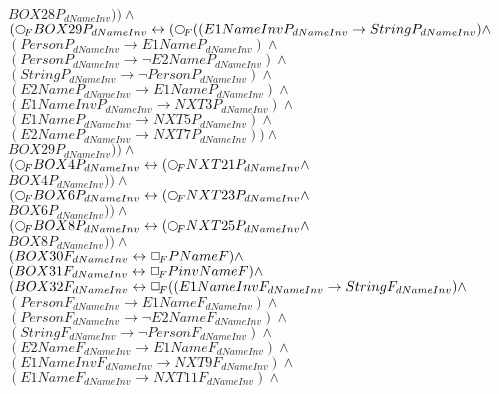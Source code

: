 \documentclass[a4paper,10pt]{article}
\begin{document}
 $ BOX28P_{dNameInv})) \land $ \\ 
 $ ( \Rnext BOX29P_{dNameInv} \leftrightarrow ( \Rnext ((E1NameInvP_{dNameInv} \rightarrow StringP_{dNameInv}) \land $ \\ 
 $ (PersonP_{dNameInv} \rightarrow E1NameP_{dNameInv}) \land $ \\ 
 $ (PersonP_{dNameInv} \rightarrow  \lnot E2NameP_{dNameInv}) \land $ \\ 
 $ (StringP_{dNameInv} \rightarrow  \lnot PersonP_{dNameInv}) \land $ \\ 
 $ (E2NameP_{dNameInv} \rightarrow E1NameP_{dNameInv}) \land $ \\ 
 $ (E1NameInvP_{dNameInv} \rightarrow NXT3P_{dNameInv}) \land $ \\ 
 $ (E1NameP_{dNameInv} \rightarrow NXT5P_{dNameInv}) \land $ \\ 
 $ (E2NameP_{dNameInv} \rightarrow NXT7P_{dNameInv})) \land $ \\ 
 $ BOX29P_{dNameInv})) \land $ \\ 
 $ ( \Rnext BOX4P_{dNameInv} \leftrightarrow ( \Rnext NXT21P_{dNameInv} \land $ \\ 
 $ BOX4P_{dNameInv})) \land $ \\ 
 $ ( \Rnext BOX6P_{dNameInv} \leftrightarrow ( \Rnext NXT23P_{dNameInv} \land $ \\ 
 $ BOX6P_{dNameInv})) \land $ \\ 
 $ ( \Rnext BOX8P_{dNameInv} \leftrightarrow ( \Rnext NXT25P_{dNameInv} \land $ \\ 
 $ BOX8P_{dNameInv})) \land $ \\ 
 $ (BOX30F_{dNameInv} \leftrightarrow  \Box_{\!F} PNameF) \land $ \\ 
 $ (BOX31F_{dNameInv} \leftrightarrow  \Box_{\!F} PinvNameF) \land $ \\ 
 $ (BOX32F_{dNameInv} \leftrightarrow  \Box_{\!F} ((E1NameInvF_{dNameInv} \rightarrow StringF_{dNameInv}) \land $ \\ 
 $ (PersonF_{dNameInv} \rightarrow E1NameF_{dNameInv}) \land $ \\ 
 $ (PersonF_{dNameInv} \rightarrow  \lnot E2NameF_{dNameInv}) \land $ \\ 
 $ (StringF_{dNameInv} \rightarrow  \lnot PersonF_{dNameInv}) \land $ \\ 
 $ (E2NameF_{dNameInv} \rightarrow E1NameF_{dNameInv}) \land $ \\ 
 $ (E1NameInvF_{dNameInv} \rightarrow NXT9F_{dNameInv}) \land $ \\ 
 $ (E1NameF_{dNameInv} \rightarrow NXT11F_{dNameInv}) \land $ \\ 
\end{document}
